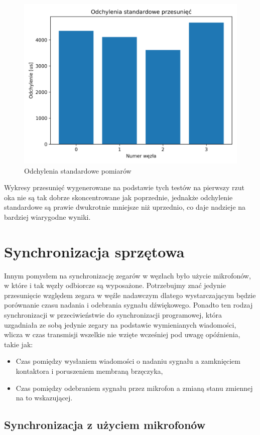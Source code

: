 \begin{figure}[h]
\centering
    \includegraphics[width=.49\textwidth]{pics/time_deltas/stddev.png}
\caption{Odchylenia standardowe pomiarów}
\label{pic:stddev_deltas}
\end{figure}

Wykresy przesunięć wygenerowane na podstawie tych testów na pierwszy rzut oka nie są tak dobrze skoncentrowane jak poprzednie, jednakże odchylenie standardowe są prawie dwukrotnie mniejsze niż uprzednio, co daje nadzieje na bardziej wiarygodne wyniki.

\section{Synchronizacja sprzętowa}

Innym pomysłem na synchronizację zegarów w węzłach było użycie mikrofonów, w które i tak węzły odbiorcze są wyposażone. Potrzebujmy znać jedynie przesunięcie względem zegara w węźle nadawczym dlatego wystarczającym będzie porównanie czasu nadania i odebrania sygnału dźwiękowego. Ponadto ten rodzaj synchronizacji w przeciwieństwie do synchronizacji programowej, która uzgadniała ze sobą jedynie zegary na podstawie wymienianych wiadomości, wlicza w czas transmisji wszelkie nie wzięte wcześniej pod uwagę opóźnienia, takie jak:

\begin{itemize}
    \item Czas pomiędzy wysłaniem wiadomości o nadaniu sygnału a zamknięciem kontaktora i poruszeniem membraną brzęczyka,
    \item Czas pomiędzy odebraniem sygnału przez mikrofon a zmianą stanu zmiennej na to wskazującej.
\end{itemize}



\subsection{Synchronizacja z użyciem mikrofonów}
